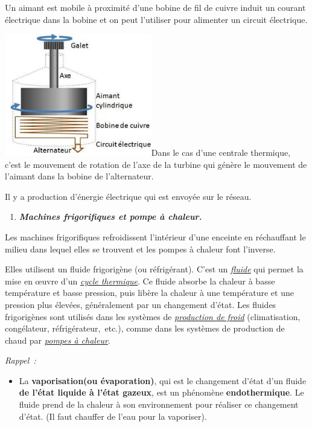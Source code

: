 Un aimant est mobile à proximité d'une bobine de fil de cuivre induit un
courant électrique dans la bobine et on peut l'utiliser pour alimenter
un circuit électrique.

\includegraphics[width=6.424cm,height=5.339cm]{Pictures/10000001000001380000010305BEE511D6A017FC.png}Dans
le cas d'une centrale thermique, c'est le mouvement de rotation de l'axe
de la turbine qui génère le mouvement de l'aimant dans la bobine de
l'alternateur.

Il y a production d'énergie électrique qui est envoyée sur le réseau.

\begin{enumerate}
\def\labelenumi{\alph{enumi})}
\tightlist
\item
  \emph{\textbf{Machines frigorifiques et pompe à chaleur.}}
\end{enumerate}

Les machines frigorifiques refroidissent l'intérieur d'une enceinte en
réchauffant le milieu dans lequel elles se trouvent et les pompes à
chaleur font l'inverse.

Elles utilisent un fluide frigorigène (ou réfrigérant). C'est un
\href{https://fr.wikipedia.org/wiki/Fluide_(mati\%C3\%A8re)}{\emph{\emph{fluide}}}
qui permet la mise en œuvre d'un
\href{https://fr.wikipedia.org/wiki/Cycle_frigorifique}{\emph{\emph{cycle
thermique}}}. Ce fluide absorbe la chaleur à basse température et basse
pression, puis libère la chaleur à une température et une pression plus
élevées, généralement par un changement d'état. Les fluides frigorigènes
sont utilisés dans les systèmes de
\href{https://fr.wikipedia.org/wiki/R\%C3\%A9frig\%C3\%A9ration}{\emph{\emph{production
de froid}}} (climatisation, congélateur, réfrigérateur,~etc.), comme
dans les systèmes de production de chaud par
\href{https://fr.wikipedia.org/wiki/Pompe_\%C3\%A0_chaleur}{\emph{\emph{pompes
à chaleur}}}.

\emph{Rappel~: }

\begin{itemize}
\tightlist
\item
  La \textbf{vaporisation(ou évaporation)}, qui est le changement d'état
  d'un fluide \textbf{de l'état liquide à l'état gazeux}, est un
  phénomène \textbf{endothermique}. Le fluide prend de la chaleur à son
  environnement pour réaliser ce changement d'état. (Il faut chauffer de
  l'eau pour la vaporiser).
\end{itemize}

